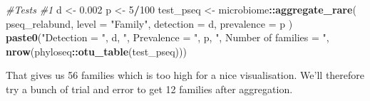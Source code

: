 \documentclass[
]{book}
\newenvironment{Shaded}{\begin{snugshade}}{\end{snugshade}}
\newcommand{\AttributeTok}[1]{\textcolor[rgb]{0.13,0.29,0.53}{#1}}
\newcommand{\CommentTok}[1]{\textcolor[rgb]{0.56,0.35,0.01}{\textit{#1}}}
\newcommand{\DecValTok}[1]{\textcolor[rgb]{0.00,0.00,0.81}{#1}}
\newcommand{\FloatTok}[1]{\textcolor[rgb]{0.00,0.00,0.81}{#1}}
\newcommand{\FunctionTok}[1]{\textcolor[rgb]{0.13,0.29,0.53}{\textbf{#1}}}
\newcommand{\NormalTok}[1]{#1}
\newcommand{\OtherTok}[1]{\textcolor[rgb]{0.56,0.35,0.01}{#1}}
\newcommand{\SpecialCharTok}[1]{\textcolor[rgb]{0.81,0.36,0.00}{\textbf{#1}}}
\newcommand{\StringTok}[1]{\textcolor[rgb]{0.31,0.60,0.02}{#1}}
\begin{document}
\begin{Shaded}
\begin{Highlighting}[]
\CommentTok{\#Tests}
\CommentTok{\#1}
\NormalTok{d }\OtherTok{\textless{}{-}} \FloatTok{0.002}
\NormalTok{p }\OtherTok{\textless{}{-}} \DecValTok{5}\SpecialCharTok{/}\DecValTok{100}
\NormalTok{test\_pseq }\OtherTok{\textless{}{-}}\NormalTok{ microbiome}\SpecialCharTok{::}\FunctionTok{aggregate\_rare}\NormalTok{(}
\NormalTok{  pseq\_relabund, }\AttributeTok{level =} \StringTok{"Family"}\NormalTok{,}
  \AttributeTok{detection =}\NormalTok{ d, }\AttributeTok{prevalence =}\NormalTok{ p}
\NormalTok{)}
\FunctionTok{paste0}\NormalTok{(}\StringTok{"Detection = "}\NormalTok{, d, }\StringTok{", Prevalence = "}\NormalTok{, p,}
       \StringTok{", Number of families = "}\NormalTok{, }\FunctionTok{nrow}\NormalTok{(phyloseq}\SpecialCharTok{::}\FunctionTok{otu\_table}\NormalTok{(test\_pseq)))}
\end{Highlighting}
\end{Shaded}

That gives us 56 families which is too high for a nice visualisation. We'll therefore try a bunch of trial and error to get 12 families after aggregation.
\end{document}
